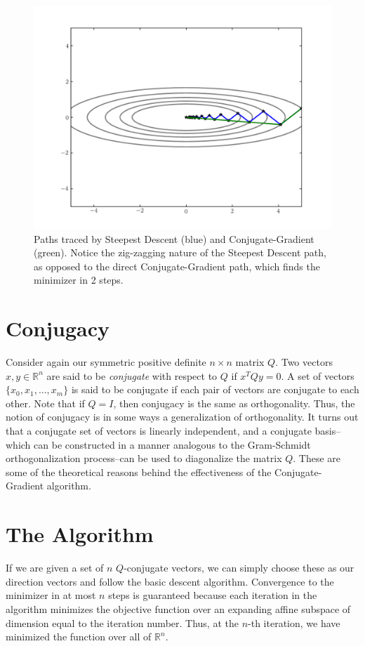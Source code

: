 \begin{figure}
\centering
\includegraphics[width=\textwidth]{steepVsConj.pdf}
\caption{Paths traced by Steepest Descent (blue) and Conjugate-Gradient (green). Notice the
zig-zagging nature of the Steepest Descent path, as opposed to the direct Conjugate-Gradient path,
which finds the minimizer in 2 steps.}
\label{basis:steepVsConj}
\end{figure}

\section*{Conjugacy}
Consider again our symmetric positive definite $n \times n$ matrix $Q$. Two vectors $x, y \in \mathbb{R}^n$ are said to be \emph{conjugate} 
with respect to $Q$ if $x^TQy = 0$. A set of vectors $\{x_0, x_1, \ldots, x_m\}$ is said to be conjugate if each pair of vectors are conjugate 
to each other. Note that if $Q = I$, then conjugacy is the same as orthogonality. Thus, the notion of conjugacy is in some ways a generalization 
of orthogonality. It turns out that a conjugate set of vectors is linearly independent, and a conjugate basis--which can be constructed in a manner
analogous to the Gram-Schmidt orthogonalization process--can be used to diagonalize the matrix $Q$. 
These are some of the theoretical reasons behind the effectiveness of the Conjugate-Gradient algorithm.

\section*{The Algorithm}
If we are given a set of $n$ $Q$-conjugate vectors, we can simply choose these as our direction vectors and follow the basic descent algorithm. 
Convergence to the minimizer in at most $n$ steps is guaranteed because each iteration in the algorithm minimizes the objective function 
over an expanding affine subspace of dimension equal to the iteration number. Thus, at the $n$-th iteration, we have minimized the function over all of 
$\mathbb{R}^n$. 

